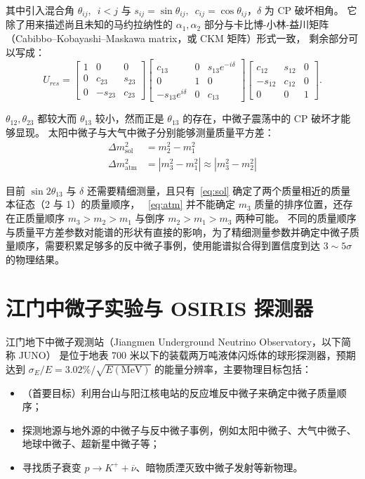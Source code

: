 其中引入混合角 $\theta_{ij},\enspace i<j$ 与 $s_{ij}=\sin{\theta_{ij}},\enspace c_{ij}=\cos{\theta_{ij}}$，$\delta$ 为 CP 破坏相角。
它除了用来描述尚且未知的马约拉纳性的 $\alpha_1,\alpha_2$ 部分与卡比博-小林-益川矩阵（Cabibbo–Kobayashi–Maskawa matrix，或 CKM 矩阵）形式一致，
剩余部分可以写成：
\begin{equation}
    U_{res}=
    \begin{bmatrix}
    1&0&0\\0&c_{23}&s_{23}\\0&-s_{23}&c_{23}
    \end{bmatrix}
    \begin{bmatrix}
    c_{13}&0&s_{13}e^{-i\delta}\\0&1&0\\-s_{13}e^{i\delta}&0&c_{13}
    \end{bmatrix}
    \begin{bmatrix}
    c_{12}&s_{12}&0\\-s_{12}&c_{12}&0\\0&0&1
    \end{bmatrix}.
\end{equation}

$\theta_{12},\theta_{23}$ 都较大而 $\theta_{13}$ 较小，然而正是 $\theta_{13}$ 的存在，中微子震荡中的 CP 破坏才能够显现。
太阳中微子与大气中微子分别能够测量质量平方差：
\begin{align}
    \Delta m_{\text{sol}}^2&=m_2^2-m_1^2\label{eq:sol}\\
    \Delta m_{\text{atm}}^2&=\left|m_3^2-m_1^2\right|\approx\left|m_3^2-m_2^2\right|\label{eq:atm}
\end{align}

目前 $\sin{2\theta_{13}}$ 与 $\delta$ 还需要精细测量，且只有~\eqref{eq:sol} 确定了两个质量相近的质量本征态（2 与 1）的质量顺序，
~\eqref{eq:atm} 并不能确定 $m_3$ 质量的排序位置，还存在正质量顺序 $m_3>m_2>m_1$ 与倒序 $m_2>m_1>m_3$ 两种可能。
不同的质量顺序与质量平方差参数对能谱的形状有直接的影响，为了精细测量参数并确定中微子质量顺序，需要积累足够多的反中微子事例，使用能谱拟合得到置信度到达 $3\sim5\sigma$ 的物理结果。

\section{江门中微子实验与 OSIRIS 探测器}
江门地下中微子观测站（Jiangmen Underground Neutrino Observatory，以下简称 JUNO）\cite{JUNOPhysicsDetector2022}
是位于地表 700 米以下的装载两万吨液体闪烁体的球形探测器，预期达到 $\sigma_E/E=3.02\%/\sqrt{E(\text{MeV})}$ 的能量分辨率，主要物理目标包括：
\begin{itemize}
    \item （首要目标）利用台山与阳江核电站的反应堆反中微子来确定中微子质量顺序；
    \item 探测地源与地外源的中微子与反中微子事例，例如太阳中微子、大气中微子、地球中微子、超新星中微子等；
    \item 寻找质子衰变 $p\rightarrow K^{+}+\overline{\nu}$、暗物质湮灭致中微子发射等新物理。
\end{itemize}

